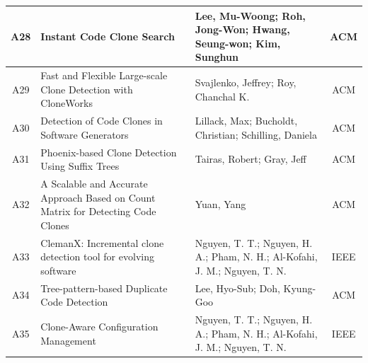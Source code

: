 \begin{table}[ht]
{\begin{tabular}{cllc}
			A28  & Instant Code Clone Search                                                                                                            & Lee, Mu-Woong; Roh, Jong-Won; Hwang, Seung-won; Kim, Sunghun                                                          & ACM                                                       \\\hline 
			A29  & Fast and Flexible Large-scale Clone Detection with CloneWorks                                                                        & Svajlenko, Jeffrey; Roy, Chanchal K.                                                                                  & ACM                                                       \\\hline 
			A30  & Detection of Code Clones in Software Generators                                                                                      & Lillack, Max; Bucholdt, Christian; Schilling, Daniela                                                                 & ACM                                                       \\\hline 
			
			
			A31  & Phoenix-based Clone Detection Using Suffix Trees                                                                                     & Tairas, Robert; Gray, Jeff                                                                                            & ACM                                                       \\\hline 
			A32  & A Scalable and Accurate Approach Based on Count Matrix for Detecting Code Clones                                                     & Yuan, Yang                                                                                                            & ACM                                                       \\\hline 
			
			
			A33  & ClemanX: Incremental clone detection tool for evolving software                                                                      & Nguyen, T. T.; Nguyen, H. A.; Pham, N. H.;  Al-Kofahi, J. M.; Nguyen, T. N.                                           & IEEE                                                      \\\hline 
			
			
			
			A34  & Tree-pattern-based Duplicate Code Detection                                                                                          & Lee, Hyo-Sub; Doh, Kyung-Goo                                                                                          & ACM                                                       \\\hline 
			A35  & Clone-Aware Configuration Management                                                                                                 & Nguyen, T. T.; Nguyen, H. A.; Pham, N. H.;  Al-Kofahi, J. M.; Nguyen, T. N.                                           & IEEE                                                      \\\hline 
			

\end{tabular}}
\end{table}
